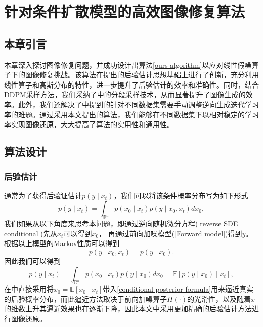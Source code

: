 \chapter{针对条件扩散模型的高效图像修复算法}
\section{本章引言}
本章深入探讨图像修复问题，并成功设计出算法\ref{ours algorithm}以应对线性假噪算子下的图像修复挑战。该算法在\cite{Inverse}提出的后验估计思想基础上进行了创新，充分利用线性算子和高斯分布的特性，进一步提升了后验估计的效率和准确性。同时，结合DDPM采样方法，我们采纳了\cite{DDIM}中的分段采样技术，从而显著提升了图像生成的效率。此外，我们还解决了\cite{Inverse}中提到的针对不同数据集需要手动调整逆向生成迭代学习率的难题。通过采用本文提出的算法，我们能够在不同数据集下以相对稳定的学习率实现图像还原，大大提高了算法的实用性和通用性。

\section{算法设计}
\subsection{后验估计}
通常为了获得后验证估计$p(y\mid x_t)$，我们可以将该条件概率分布写为如下形式
\begin{equation}
    p(y\mid x_t) = \int_{\mathbb{R}^n} p(x_0\mid x_t) p(y\mid x_0,x_t) dx_0,
\end{equation}
我们如果从以下角度来思考本问题，即通过逆向随机微分方程(\ref{reverse SDE conditional})先从$x_t$可以得到$x_0$， 再通过前向加噪模型(\ref{Forward model})得到$y$。根据以上模型的Markov性质可以得到
\begin{equation}
     p(y\mid x_0,x_t) = p(y\mid x_0).
\end{equation}
因此我们可以得到
\begin{equation}
    p(y\mid x_t) = \int_{\mathbb{R}^n} p(x_0\mid x_t) p(y\mid x_0) dx_0=\mathbb{E}\left[p(y\mid x_0)\mid x_t\right],
    \label{conditional posterior formula}
\end{equation}
在\cite{Inverse}中直接采用将$\hat{x}_0=\mathbb{E}\left[x_0\mid x_t\right]$带入\ref{conditional posterior formula}用来逼近真实的后验概率分布，而此逼近方法取决于前向加噪算子$H(\cdot)$的光滑性，以及随着$x$的维数上升其逼近效果也在逐渐下降，因此本文中采用更加精确的后验估计方法进行图像还原。     


